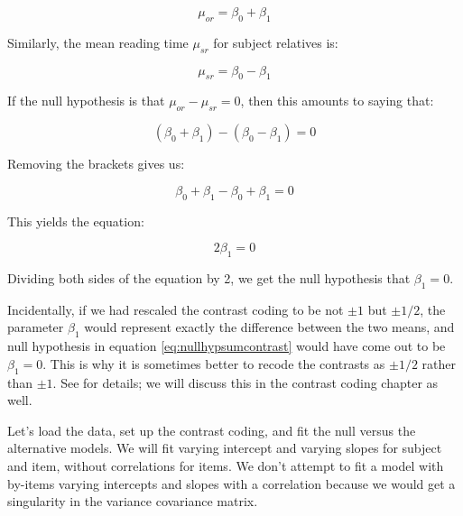 \documentclass[12pt,]{krantz}
\begin{document}
\begin{equation}
\mu_{or}=\beta_0 + \beta_1
\end{equation}

Similarly, the mean reading time \(\mu_{sr}\) for subject relatives is:

\begin{equation}
\mu_{sr}=\beta_0 - \beta_1
\end{equation}

If the null hypothesis is that \(\mu_{or}-\mu_{sr}=0\), then this amounts to saying that:

\begin{equation}
(\beta_0 + \beta_1)-(\beta_0 - \beta_1)=0
\end{equation}

Removing the brackets gives us:

\begin{equation}
\beta_0 + \beta_1-\beta_0 + \beta_1 = 0
\end{equation}

This yields the equation:

\begin{equation} \label{eq:nullhypsumcontrast}
2\beta_1= 0
\end{equation}

Dividing both sides of the equation by 2, we get the null hypothesis that \(\beta_1=0\).

Incidentally, if we had rescaled the contrast coding to be not \(\pm 1\) but \(\pm 1/2\), the parameter \(\beta_1\) would represent exactly the difference between the two means, and null hypothesis in equation \eqref{eq:nullhypsumcontrast} would have come out to be \(\beta_1= 0\). This is why it is sometimes better to recode the contrasts as \(\pm 1/2\) rather than \(\pm 1\). See \citet{SchadEtAlcontrasts} for details; we will discuss this in the contrast coding chapter as well.

Let's load the data, set up the contrast coding, and fit the null versus the alternative models. We will fit varying intercept and varying slopes for subject and item, without correlations for items. We don't attempt to fit a model with by-items varying intercepts and slopes with a correlation because we would get a singularity in the variance covariance matrix.
\end{document}
